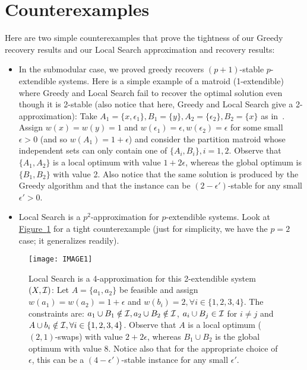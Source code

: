 \section{Counterexamples}\label{sec:counter}

Here are two simple counterexamples that prove the tightness of our Greedy recovery results and our Local Search approximation and recovery results:

\begin{itemize}
\item In the submodular case, we proved greedy recovers $(p+1)$-stable $p$-extendible systems. Here is a simple example of a matroid (1-extendible) where Greedy and Local Search fail to recover the optimal solution even though it is 2-stable (also notice that here, Greedy and Local Search give a 2-approximation):  Take $A_1=\{x,\epsilon_1\}, B_1=\{y\}, A_2=\{\epsilon_2\}, B_2=\{x\}$ as in~\cite{filmus2012power}. Assign $w(x)=w(y)=1$ and $w(\epsilon_1)=\epsilon, w(\epsilon_2)=\epsilon$ for some small $\epsilon>0$ (and so $w(A_1)=1+\epsilon$) and consider the partition matroid whose independent sets can only contain one of $\{A_i,B_i\}, i=1,2$. Observe that $\{A_1,A_2\}$ is a local optimum with value $1+2\epsilon$, whereas the global optimum is $\{B_1,B_2\}$ with value 2. Also notice that the same solution is produced by the Greedy algorithm and that the instance can be $(2-\epsilon')$-stable for any small $\epsilon'>0$.

\item Local Search is a $p^2$-approximation for $p$-extendible systems. Look at \hyperref[counter1]{Figure~\ref{counter1}} for a tight counterexample (just for simplicity, we have the $p=2$ case; it generalizes readily).
\end{itemize} 


\begin{figure}[h!]
	\centering
	\texttt{[image: IMAGE1]}
        	\caption{Local Search is a 4-approximation for this 2-extendible system $(X,\mathcal{I})$: Let $A=\{a_1,a_2\}$ be feasible and assign $w(a_1)=w(a_2)=1+\epsilon$ and $w(b_i)=2, \forall i\in\{1,2,3,4\}$. The constraints are: $a_1\cup B_1 \notin \mathcal{I}, a_2\cup B_2 \notin \mathcal{I} $, $a_i\cup B_j \in \mathcal{I}$ for $i\neq j$ and $A\cup b_i\notin \mathcal{I},\forall i\in\{1,2,3,4\}$. Observe that $A$ is a local optimum ($(2,1)$-swaps) with value $2+2\epsilon$, whereas $B_1\cup B_2$ is the global optimum with value 8. Notice also that for the appropriate choice of $\epsilon$, this can be a $(4-\epsilon')$-stable instance for any small $\epsilon'$.}
	\label{counter1}
\end{figure}

